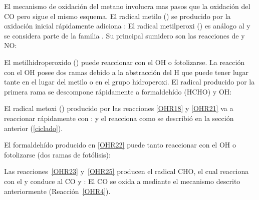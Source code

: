 El mecanismo de oxidación del metano involucra mas pasos que la oxidación del CO pero sigue el mismo esquema. El radical metilo () se producido por la oxidación inicial rápidamente adiciona :
El radical metilperoxi () es análogo al  y se considera parte de la familia . Su principal sumidero son las reacciones de    y NO:

El metilhidroperoxido () puede reaccionar con el OH o fotolizarse. La reacción con el OH posee dos ramas debido a la abstracción del H que puede tener lugar tante en el lugar del metilo o en el grupo hidroperoxi. El radical   producido por la primera rama se descompone rápidamente a formaldehído (HCHO) y OH:


El radical metoxi () producido por las reacciones \ref{OHR18} y \ref{OHR21} va a reaccionar rápidamente con :
y el  reacciona  como se describió en la sección anterior (\ref{ciclado}).

El formaldehído producido en \ref{OHR22} puede tanto reaccionar con el OH o fotolizarse (dos ramas de fotólisis):

Las reacciones~\ref{OHR23} y~\ref{OHR25} producen el radical CHO, el cual reacciona con el  y conduce al CO y :
El CO se oxida a  mediante el mecanismo descrito anteriormente (Reacción~\ref{OHR4}).

